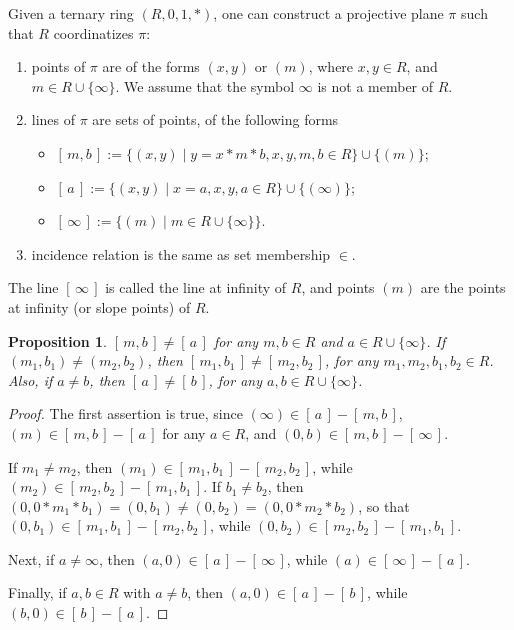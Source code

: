 \documentclass[12pt]{article}
\newtheorem{prop}{Proposition}
\begin{document}
Given a ternary ring $(R,0,1,*)$, one can construct a projective plane $\pi$ such that $R$ coordinatizes $\pi$:

\begin{enumerate}
\item points of $\pi$ are of the forms $(x,y)$ or $(m)$, where $x,y\in R$, and $m\in R\cup \lbrace \infty\rbrace$.  We assume that the symbol $\infty$ is not a member of $R$.
\item lines of $\pi$ are sets of points, of the following forms
\begin{itemize}
\item $[\,m,b\,]:=\lbrace (x,y)\mid y=x*m*b, x,y,m,b\in R\rbrace \cup \lbrace (m)\rbrace$;
\item $[\,a\,]:=\lbrace (x,y)\mid x=a, x,y,a\in R\rbrace \cup \lbrace (\infty)\rbrace$;
\item $[\,\infty\,]:=\lbrace (m)\mid m\in R\cup \lbrace \infty\rbrace \rbrace$.
\end{itemize}
\item incidence relation is the same as set membership $\in$.
\end{enumerate}

The line $[\,\infty\,]$ is called the line at infinity of $R$, and points $(m)$ are the points at infinity (or slope points) of $R$.

\begin{prop}  $[\,m,b\,]\ne [\,a\,]$ for any $m,b\in R$ and $a\in R\cup\lbrace \infty\rbrace$.  If $(m_1,b_1)\ne (m_2,b_2)$, then $[\,m_1,b_1\,]\ne [\,m_2,b_2\,]$, for any $m_1,m_2,b_1,b_2\in R$.  Also, if $a\ne b$, then $[\,a\,]\ne [\,b\,]$, for any $a,b\in R\cup\lbrace \infty\rbrace$.
\end{prop}
\begin{proof}  The first assertion is true, since $(\infty)\in [\,a\,]-[\,m,b\,]$, $(m)\in [\,m,b\,]-[\,a\,]$ for any $a\in R$, and $(0,b)\in [\,m,b\,]-[\,\infty\,]$.

If $m_1\ne m_2$, then $(m_1)\in [\,m_1,b_1\,]- [\,m_2,b_2\,]$, while $(m_2)\in [\,m_2,b_2\,]- [\,m_1,b_1\,]$.  If $b_1\ne b_2$, then $(0,0*m_1*b_1)=(0,b_1)\ne (0,b_2)=(0,0*m_2*b_2)$, so that $(0,b_1)\in  [\,m_1,b_1\,]- [\,m_2,b_2\,]$, while $(0,b_2)\in [\,m_2,b_2\,]- [\,m_1,b_1\,]$.  

Next, if $a\ne \infty$, then $(a,0)\in [\,a\,]-[\,\infty\,]$, while $(a)\in [\,\infty\,]-[\,a\,]$.  

Finally, if $a,b\in R$ with $a\ne b$, then $(a,0)\in [\,a\,]-[\,b\,]$, while $(b,0)\in [\,b\,]-[\,a\,]$.\end{proof}
\end{document}
